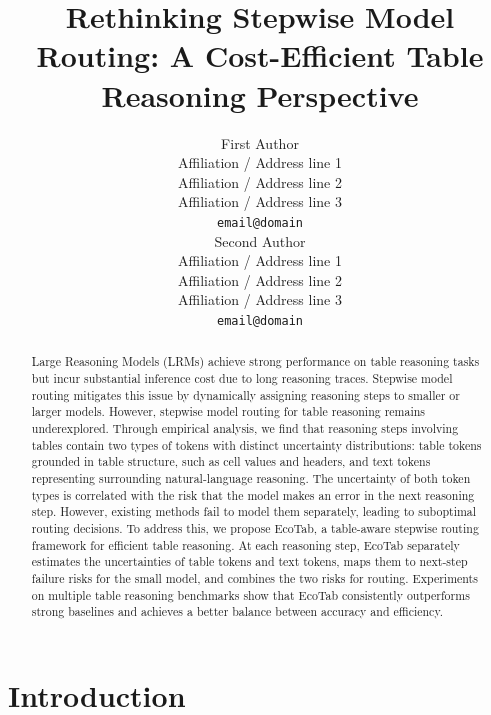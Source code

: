 \documentclass[11pt]{article}
\title{Rethinking Stepwise Model Routing: A Cost-Efficient Table Reasoning Perspective}
\author{First Author \\
  Affiliation / Address line 1 \\
  Affiliation / Address line 2 \\
  Affiliation / Address line 3 \\
  \texttt{email@domain} \\\And
  Second Author \\
  Affiliation / Address line 1 \\
  Affiliation / Address line 2 \\
  Affiliation / Address line 3 \\
  \texttt{email@domain} \\}
\begin{document}
\maketitle
\begin{abstract}
Large Reasoning Models (LRMs) achieve strong performance on table reasoning tasks but incur substantial inference cost due to long reasoning traces. Stepwise model routing mitigates this issue by dynamically assigning reasoning steps to smaller or larger models. However, stepwise model routing for table reasoning remains underexplored. Through empirical analysis, we find that reasoning steps involving tables contain two types of tokens with distinct uncertainty distributions: table tokens grounded in table structure, such as cell values and headers, and text tokens representing surrounding natural-language reasoning. The uncertainty of both token types is correlated with the risk that the model makes an error in the next reasoning step. However, existing methods fail to model them separately, leading to suboptimal routing decisions. To address this, we propose EcoTab, a table-aware stepwise routing framework for efficient table reasoning. At each reasoning step, EcoTab separately estimates the uncertainties of table tokens and text tokens, maps them to next-step failure risks for the small model, and combines the two risks for routing. Experiments on multiple table reasoning benchmarks show that EcoTab consistently outperforms strong baselines and achieves a better balance between accuracy and efficiency.
\end{abstract}



\section{Introduction}

\end{document}
